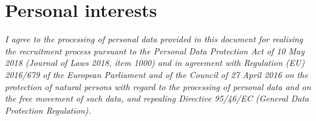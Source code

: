 \documentclass{moderncv}
\begin{document}
\section{Personal interests}

\vfill
\begin{center}
\textit{\small I agree to the processing of personal data provided in this document for realising the recruitment process pursuant to the Personal Data Protection Act of 10 May 2018 (Journal of Laws 2018, item 1000) and in agreement with Regulation (EU) 2016/679 of the European Parliament and of the Council of 27 April 2016 on the protection of natural persons with regard to the processing of personal data and on the free movement of such data, and repealing Directive 95/46/EC (General Data Protection Regulation).}
\end{center}
\end{document}
